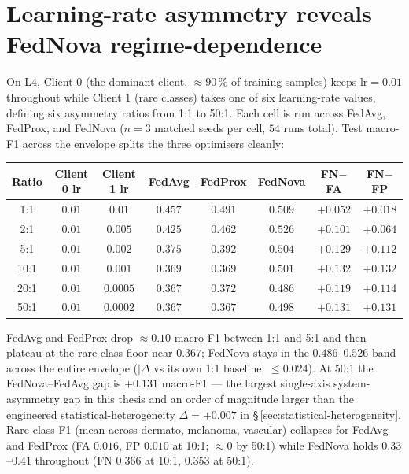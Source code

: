 
\section{Learning-rate asymmetry reveals FedNova regime-dependence}
\label{sec:lr-asymmetry}

On L4, Client 0 (the dominant client, $\approx 90\,\%$ of training samples)
keeps $\textrm{lr} = 0.01$ throughout while Client 1 (rare classes) takes
one of six learning-rate values, defining six asymmetry ratios from 1:1 to
50:1. Each cell is run across FedAvg, FedProx, and FedNova ($n=3$ matched
seeds per cell, $54$ runs total). Test macro-F1 across the envelope splits
the three optimisers cleanly:

\begin{center}
\begin{tabular}{c|cc|ccc|cc}
\hline
Ratio & Client 0 lr & Client 1 lr & FedAvg & FedProx & FedNova & FN$-$FA & FN$-$FP \\
\hline
 1:1  & $0.01$ & $0.01$    & $0.457$ & $0.491$ & $\mathbf{0.509}$ & $+0.052$ & $+0.018$ \\
 2:1  & $0.01$ & $0.005$   & $0.425$ & $0.462$ & $\mathbf{0.526}$ & $+0.101$ & $+0.064$ \\
 5:1  & $0.01$ & $0.002$   & $0.375$ & $0.392$ & $\mathbf{0.504}$ & $+0.129$ & $+0.112$ \\
10:1  & $0.01$ & $0.001$   & $0.369$ & $0.369$ & $\mathbf{0.501}$ & $+0.132$ & $+0.132$ \\
20:1  & $0.01$ & $0.0005$  & $0.367$ & $0.372$ & $\mathbf{0.486}$ & $+0.119$ & $+0.114$ \\
50:1  & $0.01$ & $0.0002$  & $0.367$ & $0.367$ & $\mathbf{0.498}$ & $\mathbf{+0.131}$ & $\mathbf{+0.131}$ \\
\hline
\end{tabular}
\end{center}

FedAvg and FedProx drop $\approx 0.10$ macro-F1 between 1:1 and 5:1 and then
plateau at the rare-class floor near $0.367$; FedNova stays in the
$0.486$--$0.526$ band across the entire envelope ($|\Delta$ vs its own 1:1
baseline$|$ $\leq 0.024$). At 50:1 the FedNova--FedAvg gap is $+0.131$ macro-F1
--- the largest single-axis system-asymmetry gap in this thesis and an order
of magnitude larger than the engineered statistical-heterogeneity
$\Delta = +0.007$ in \S\,\ref{sec:statistical-heterogeneity}. Rare-class F1
(mean across dermato, melanoma, vascular) collapses for FedAvg and FedProx
(FA $0.016$, FP $0.010$ at 10:1; $\approx 0$ by 50:1) while FedNova holds
$0.33$--$0.41$ throughout (FN $0.366$ at 10:1, $0.353$ at 50:1).

